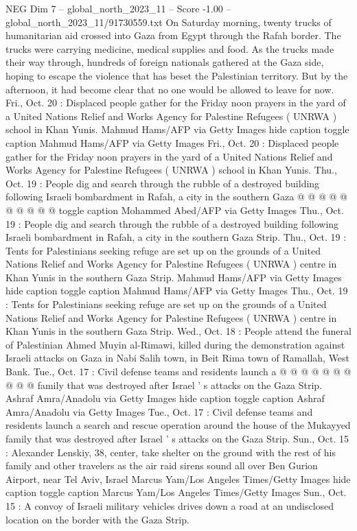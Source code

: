 \begin{textsample}{NEG Dim 7 – global\_north\_2023\_11 – Score -1.00 – global\_north\_2023\_11/91730559.txt}  \label{ex:f7_neg_322}
On Saturday morning, twenty trucks of humanitarian aid crossed into Gaza from Egypt through the Rafah border.
The trucks were carrying medicine, medical supplies and food.
As the trucks made their way through, hundreds of foreign nationals gathered at the Gaza side, hoping to escape the violence that has beset the Palestinian territory.
But by the afternoon, it had become clear that no one would be allowed to leave for now.
Fri., Oct. 20 : Displaced people gather for the Friday noon prayers in the yard of a United Nations Relief and Works Agency for Palestine Refugees ( UNRWA ) school in Khan Yunis.
Mahmud Hams/AFP via Getty Images hide caption toggle caption Mahmud Hams/AFP via Getty Images Fri., Oct. 20 : Displaced people gather for the Friday noon prayers in the yard of a United Nations Relief and Works Agency for Palestine Refugees ( UNRWA ) school in Khan Yunis.
Thu., Oct. 19 : People dig and search through the rubble of a destroyed building following Israeli bombardment in Rafah, a city in the southern Gaza @ @ @ @ @ @ @ @ @ @ toggle caption Mohammed Abed/AFP via Getty Images Thu., Oct. 19 : People dig and search through the rubble of a destroyed building following Israeli bombardment in Rafah, a city in the southern Gaza Strip.
Thu., Oct. 19 : Tents for Palestinians seeking refuge are set up on the grounds of a United Nations Relief and Works Agency for Palestine Refugees ( UNRWA ) centre in Khan Yunis in the southern Gaza Strip.
Mahmud Hams/AFP via Getty Images hide caption toggle caption Mahmud Hams/AFP via Getty Images Thu., Oct. 19 : Tents for Palestinians seeking refuge are set up on the grounds of a United Nations Relief and Works Agency for Palestine Refugees ( UNRWA ) centre in Khan Yunis in the southern Gaza Strip.
Wed., Oct. 18 : People attend the funeral of Palestinian Ahmed Muyin al-Rimawi, killed during the demonstration against Israeli attacks on Gaza in Nabi Salih town, in Beit Rima town of Ramallah, West Bank.
Tue., Oct. 17 : Civil defense teams and residents launch a @ @ @ @ @ @ @ @ @ @ family that was destroyed after Israel ' s attacks on the Gaza Strip.
Ashraf Amra/Anadolu via Getty Images hide caption toggle caption Ashraf Amra/Anadolu via Getty Images Tue., Oct. 17 : Civil defense teams and residents launch a search and rescue operation around the house of the Mukayyed family that was destroyed after Israel ' s attacks on the Gaza Strip.
Sun., Oct. 15 : Alexander Lenskiy, 38, center, take shelter on the ground with the rest of his family and other travelers as the air raid sirens sound all over Ben Gurion Airport, near Tel Aviv, Israel Marcus Yam/Los Angeles Times/Getty Images hide caption toggle caption Marcus Yam/Los Angeles Times/Getty Images Sun., Oct. 15 : A convoy of Israeli military vehicles drives down a road at an undisclosed location on the border with the Gaza Strip.

\end{textsample}
